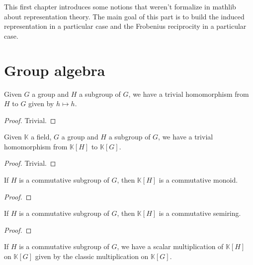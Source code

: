 This first chapter introduces some notions that weren't formalize in
mathlib about representation theory. The main goal of this part is to build
the induced representation in a particular case and the Frobenius reciprocity
in a particular case.

\section{Group algebra}

\begin{definition}
    \label{def:trivialHG}
    \uses{}
    \leanok
    Given $G$ a group and $H$ a subgroup of $G$, we have a trivial homomorphism from $H$
    to $G$ given by $h\mapsto h$.
    \begin{proof}
        \leanok
        Trivial.
    \end{proof}
\end{definition}

\begin{definition}
    \label{def:trivialkHkG}
    \uses{}
    \leanok
    Given $\mathbb{K}$ a field, $G$ a group and $H$ a subgroup of $G$, 
    we have a trivial homomorphism from $\mathbb{K}[H]$ to $\mathbb{K}[G]$.
    \begin{proof}
        \leanok
        Trivial.
    \end{proof}
\end{definition}

\begin{proposition}
    \label{prop:KHcomm}
    \uses{}
    \leanok 
    If $H$ is a commutative subgroup of $G$, then $\mathbb{K}[H]$ is a 
    commutative monoid.
\end{proposition}
\begin{proof}
    \leanok
\end{proof}

\begin{proposition}
    \label{prop:KHcommsemiring}
    \uses{}
    \leanok
    If $H$ is a commutative subgroup of $G$, then $\mathbb{K}[H]$ is a 
    commutative semiring.
\end{proposition}
\begin{proof}
    \leanok
\end{proof}

\begin{definition}
    \label{prop:KHcommsemiring}
    \leanok
    If $H$ is a commutative subgroup of $G$, we have a scalar multiplication
    of $\mathbb{K}[H]$ on $\mathbb{K}[G]$ given by the classic multiplication
    on $\mathbb{K}[G]$.
\end{definition}

